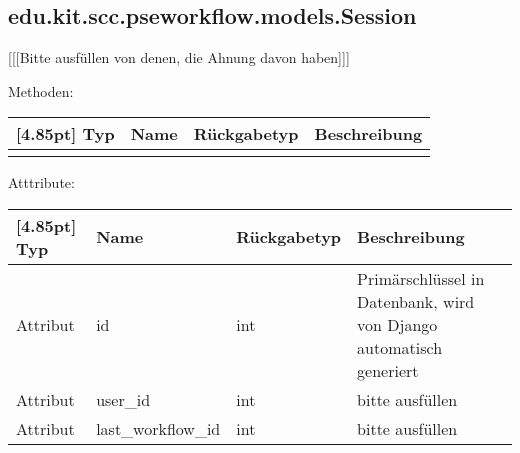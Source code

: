 		\subsection{edu.kit.scc.pseworkflow.models.Session}
			[[[Bitte ausfüllen von denen, die Ahnung davon haben]]]
			
			Methoden:
			\begin{center}
				\setlength\tabcolsep{5pt}
				\renewcommand{\arraystretch}{1.5}
				
				\begin{tabularx}{\textwidth}{|l|l|l|X|}
					\hline
					\rowcolor[gray]{0.75}[4.85pt]
					Typ & Name & Rückgabetyp & Beschreibung \\ \hline 
					&&& \\
					\hline
				\end{tabularx}
			\end{center}
			
			Atttribute:
			\begin{center}
				\setlength\tabcolsep{5pt}
				\renewcommand{\arraystretch}{1.5}
				
				\begin{tabularx}{\textwidth}{|l|l|l|X|}
					\hline
					\rowcolor[gray]{0.75}[4.85pt]
					Typ & Name & Rückgabetyp & Beschreibung \\ \hline 
					Attribut & id & int & Primärschlüssel in Datenbank, wird von Django automatisch generiert \\ \hline
					Attribut & user\_id & int & bitte ausfüllen \\ \hline
					Attribut & last\_workflow\_id & int & bitte ausfüllen \\
					\hline
				\end{tabularx}
			\end{center}
		
